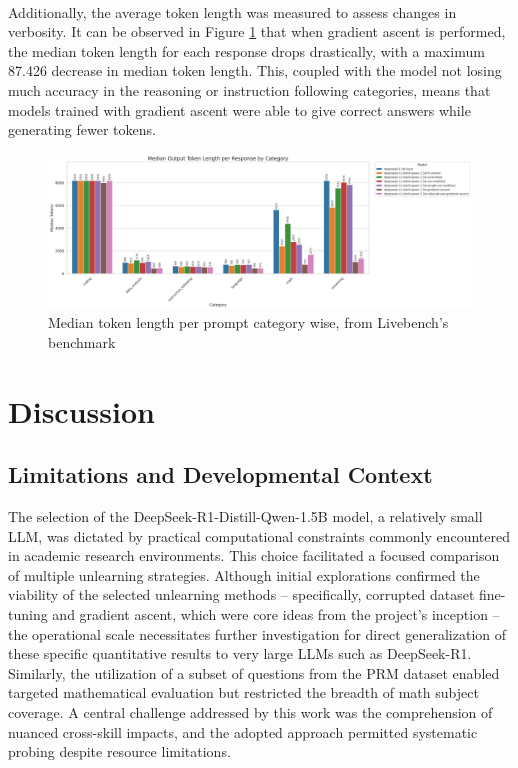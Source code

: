 \documentclass[10pt]{article}
\begin{document}
\\
Additionally, the average token length was measured to assess changes in verbosity. It can be observed in Figure \ref{fig:token_length_median} that when gradient ascent is performed, the median token length for each response drops drastically, with a maximum 87.426 decrease in median token length. This, coupled with the model not losing much accuracy in the reasoning or instruction following categories, means that models trained with gradient ascent were able to give correct answers while generating fewer tokens.
\begin{figure}[h]
    \centering
    \includegraphics[width=1\linewidth]{token_length_median_by_category.png}
    \caption{Median token length per prompt category wise, from Livebench's benchmark}
    \label{fig:token_length_median}
\end{figure}


\section{Discussion}
\subsection{Limitations and Developmental Context}
The selection of the DeepSeek-R1-Distill-Qwen-1.5B model, a relatively small LLM, was dictated by practical computational constraints commonly encountered in academic research environments. This choice facilitated a focused comparison of multiple unlearning strategies. Although initial explorations confirmed the viability of the selected unlearning methods – specifically, corrupted dataset fine-tuning and gradient ascent, which were core ideas from the project's inception – the operational scale necessitates further investigation for direct generalization of these specific quantitative results to very large LLMs such as DeepSeek-R1. Similarly, the utilization of a subset of questions from the PRM dataset \cite{lightman2023lets} enabled targeted mathematical evaluation but restricted the breadth of math subject coverage. A central challenge addressed by this work was the comprehension of nuanced cross-skill impacts, and the adopted approach permitted systematic probing despite resource limitations.
\end{document}
